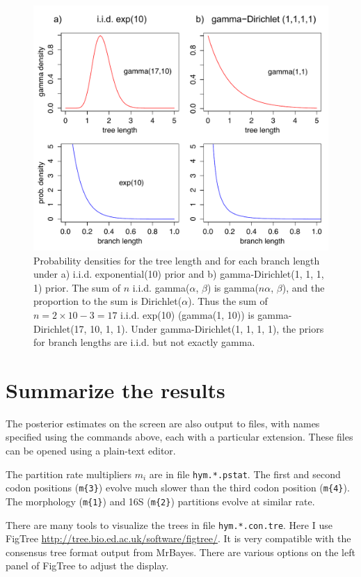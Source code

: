 \documentclass[12pt]{article}
\begin{document}
\begin{figure}[p]
\includegraphics[width=1.0\textwidth]{figures/gamdir.pdf}
\caption{Probability densities for the tree length and for each branch length under a) i.i.d. exponential(10) prior and b) gamma-Dirichlet(1, 1, 1, 1) prior.
The sum of $n$ i.i.d. gamma($\alpha$, $\beta$) is gamma($n \alpha$, $\beta$), and the proportion to the sum is Dirichlet($\alpha$).
Thus the sum of $n = 2 \times 10 - 3 = 17$ i.i.d. exp(10) (gamma(1, 10)) is gamma-Dirichlet(17, 10, 1, 1).
Under gamma-Dirichlet(1, 1, 1, 1), the priors for branch lengths are i.i.d. but not exactly gamma.
}
\label{fig_gamdir}
\end{figure}
\clearpage

\section{Summarize the results}

The posterior estimates on the screen are also output to files, with names specified using the commands above, each with a particular extension. 
These files can be opened using a plain-text editor. 

The partition rate multipliers $m_i$ are in file {\tt hym.*.pstat}. 
The first and second codon positions ({\tt m\{3\}}) evolve much slower than the third codon position ({\tt m\{4\}}). The morphology ({\tt m\{1\}}) and 16S ({\tt m\{2\}}) partitions evolve at similar rate.

There are many tools to visualize the trees in file {\tt hym.*.con.tre}.
Here I use FigTree \url{http://tree.bio.ed.ac.uk/software/figtree/}.
It is very compatible with the consensus tree format output from MrBayes.
There are various options on the left panel of FigTree to adjust the display.
\end{document}
